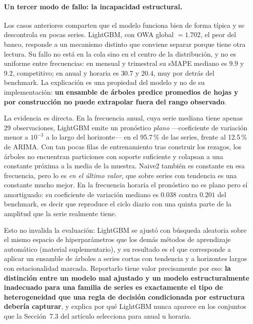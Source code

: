 \paragraph{Un tercer modo de fallo: la incapacidad estructural.} Los casos
anteriores comparten que el modelo funciona bien de forma típica y se descontrola en
pocas series. LightGBM, con OWA global $=1.702$, el peor del banco, responde a un
mecanismo distinto que conviene separar porque tiene otra lectura. Su fallo no está en
la cola sino en el centro de la distribución, y no es uniforme entre frecuencias: en
mensual y trimestral su sMAPE mediano es $9.9$ y $9.2$, competitivo; en anual y horaria
es $30.7$ y $20.4$, muy por detrás del benchmark. La explicación es una propiedad del
modelo y no de su implementación: \textbf{un ensamble de árboles predice promedios de
hojas y por construcción no puede extrapolar fuera del rango observado}.

La evidencia es directa. En la frecuencia anual, cuya serie mediana tiene apenas 29
observaciones, LightGBM emite un pronóstico \emph{plano} ---coeficiente de variación
menor a $10^{-3}$ a lo largo del horizonte--- en el 95.7\,\% de las series, frente al
12.5\,\% de ARIMA. Con tan pocas filas de entrenamiento tras construir los rezagos, los
árboles no encuentran particiones con soporte suficiente y colapsan a una constante
próxima a la media de la muestra. Naive2 también es constante en esa frecuencia, pero
lo es \emph{en el último valor}, que sobre series con tendencia es una constante mucho
mejor. En la frecuencia horaria el pronóstico no es plano pero sí amortiguado: su
coeficiente de variación mediano es $0.038$ contra $0.201$ del benchmark, es decir que
reproduce el ciclo diario con una quinta parte de la amplitud que la serie realmente
tiene.

Esto no invalida la evaluación: LightGBM se ajustó con búsqueda aleatoria sobre el
mismo espacio de hiperparámetros que los demás métodos de aprendizaje automático
(material suplementario), y su resultado es el que corresponde a aplicar un
ensamble de árboles a series cortas con tendencia y a horizontes largos con
estacionalidad marcada. Reportarlo tiene valor precisamente por eso: \textbf{la
distinción entre un modelo mal ajustado y un modelo estructuralmente inadecuado para
una familia de series es exactamente el tipo de heterogeneidad que una regla de
decisión condicionada por estructura debería capturar}, y explica por qué LightGBM
nunca aparece en los conjuntos que la Sección~7.3 del artículo selecciona para anual
u horaria.


